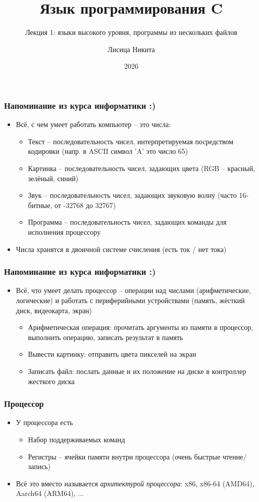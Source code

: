 \documentclass[10pt]{beamer}
\title{Язык программирования C}
\subtitle{Лекция 1: языки высокого уровня, программы из нескольких файлов}
\author{Лисица Никита}
\date{2026}
\begin{document}
\frame{\titlepage}

\begin{frame}[fragile]
\frametitle{Напоминание из курса информатики :)}
\begin{itemize}
\item Всё, с чем умеет работать компьютер -- это числа:
\pause
\begin{itemize}
\item Текст -- последовательность чисел, интерпретируемая посредством кодировки (напр. в ASCII символ 'A' это число 65)
\pause
\item Картинка -- последовательность чисел, задающих цвета (RGB -- красный, зелёный, синий)
\pause
\item Звук -- последовательность чисел, задающих звуковую волну (часто 16-битные, от -32768 до 32767)
\pause
\item Программа -- последовательность чисел, задающих команды для исполнения процессору
\end{itemize}
\pause
\item Числа хранятся в двоичной системе счисления (есть ток / нет тока)
\end{itemize}
\end{frame}

\begin{frame}[fragile]
\frametitle{Напоминание из курса информатики :)}
\begin{itemize}
\item Всё, что умеет делать процессор -- операции над числами (арифметические, логические) и работать с периферийными устройствами (память, жёсткий диск, видеокарта, экран)
\pause
\begin{itemize}
\item Арифметическая операция: прочитать аргументы из памяти в процессор, выполнить операцию, записать результат в память
\pause
\item Вывести картинку: отправить цвета пикселей на экран
\pause
\item Записать файл: послать данные и их положение на диске в контроллер жесткого диска
\end{itemize}
\end{itemize}
\end{frame}

\begin{frame}[fragile]
\frametitle{Процессор}
\begin{itemize}
\item У процессора есть
\pause
\begin{itemize}
\item Набор поддерживаемых команд
\pause
\item Регистры -- ячейки памяти внутри процессора (очень быстрые чтение/запись)
\end{itemize}
\pause
\item Всё это вместо называется \textit{архитектурой процессора}: x86, x86-64 (AMD64), Aarch64 (ARM64), ...
\end{itemize}
\end{frame}
\end{document}
